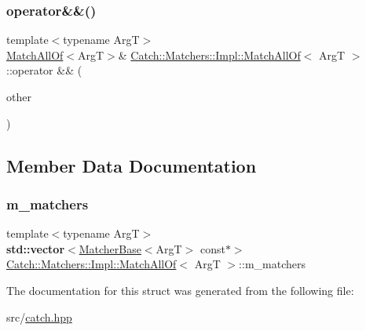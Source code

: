 \subsubsection{\texorpdfstring{operator\&\&()}{operator\&\&()}}
{\footnotesize\ttfamily template$<$typename ArgT$>$ \\
\hyperlink{struct_catch_1_1_matchers_1_1_impl_1_1_match_all_of}{Match\+All\+Of}$<$ArgT$>$\& \hyperlink{struct_catch_1_1_matchers_1_1_impl_1_1_match_all_of}{Catch\+::\+Matchers\+::\+Impl\+::\+Match\+All\+Of}$<$ ArgT $>$\+::operator \&\& (\begin{DoxyParamCaption}\item[{\hyperlink{struct_catch_1_1_matchers_1_1_impl_1_1_matcher_base}{Matcher\+Base}$<$ ArgT $>$ const \&}]{other }\end{DoxyParamCaption})\hspace{0.3cm}{\ttfamily [inline]}}



\subsection{Member Data Documentation}
\mbox{\label{struct_catch_1_1_matchers_1_1_impl_1_1_match_all_of_a98d6a2611f195a4a5c49f92fd877be9a}} 
\subsubsection{\texorpdfstring{m\+\_\+matchers}{m\_matchers}}
{\footnotesize\ttfamily template$<$typename ArgT$>$ \\
\textbf{ std\+::vector}$<$\hyperlink{struct_catch_1_1_matchers_1_1_impl_1_1_matcher_base}{Matcher\+Base}$<$ArgT$>$ const$\ast$$>$ \hyperlink{struct_catch_1_1_matchers_1_1_impl_1_1_match_all_of}{Catch\+::\+Matchers\+::\+Impl\+::\+Match\+All\+Of}$<$ ArgT $>$\+::m\+\_\+matchers}



The documentation for this struct was generated from the following file\+:\begin{DoxyCompactItemize}
\item 
src/\hyperlink{catch_8hpp}{catch.\+hpp}\end{DoxyCompactItemize}
